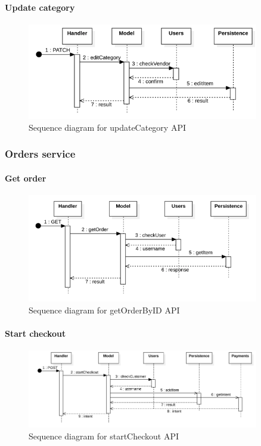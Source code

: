 \paragraph*{Update category}
\begin{figure}[H]
    \includegraphics[width=0.9\textwidth]{res/images/sequence-diagrams/categories/updateCategory.png}
    \caption{Sequence diagram for updateCategory API}
\end{figure}


\subsubsection{Orders service}
\paragraph*{Get order}
\begin{figure}[H]
    \includegraphics[width=0.9\textwidth]{res/images/sequence-diagrams/orders/getOrderByID.png}
    \caption{Sequence diagram for getOrderByID API}
\end{figure}

\paragraph*{Start checkout}
\begin{figure}[H]
    \includegraphics[width=0.9\textwidth]{res/images/sequence-diagrams/orders/startCheckout.png}
    \caption{Sequence diagram for startCheckout API}
\end{figure}

